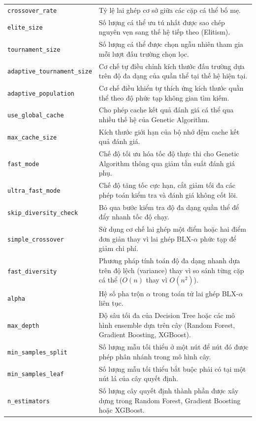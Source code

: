 \documentclass[12pt,a4paper]{article}
\begin{document}
\begin{longtable}{p{} p{}}
\texttt{crossover\_rate} & Tỷ lệ lai ghép cơ sở giữa các cặp cá thể bố mẹ. \\
\texttt{elite\_size} & Số lượng cá thể ưu tú nhất được sao chép nguyên vẹn sang thế hệ tiếp theo (Elitism). \\
\texttt{tournament\_size} & Số lượng cá thể được chọn ngẫu nhiên tham gia mỗi lượt đấu trường chọn lọc. \\
\texttt{adaptive\_tournament\_size} & Cơ chế tự điều chỉnh kích thước đấu trường dựa trên độ đa dạng của quần thể tại thế hệ hiện tại. \\
\texttt{adaptive\_population} & Cơ chế điều khiển tự thích ứng kích thước quần thể theo độ phức tạp không gian tìm kiếm. \\
\texttt{use\_global\_cache} & Cho phép cache kết quả đánh giá cá thể qua nhiều thế hệ của Genetic Algorithm. \\
\texttt{max\_cache\_size} & Kích thước giới hạn của bộ nhớ đệm cache kết quả đánh giá. \\
\texttt{fast\_mode} & Chế độ tối ưu hóa tốc độ thực thi cho Genetic Algorithm thông qua giảm tần suất đánh giá phụ. \\
\texttt{ultra\_fast\_mode} & Chế độ tăng tốc cực hạn, cắt giảm tối đa các phép toán kiểm tra và đánh giá không cốt lõi. \\
\texttt{skip\_diversity\_check} & Bỏ qua bước kiểm tra độ đa dạng quần thể để đẩy nhanh tốc độ chạy. \\
\texttt{simple\_crossover} & Sử dụng cơ chế lai ghép một điểm hoặc hai điểm đơn giản thay vì lai ghép BLX-$\alpha$ phức tạp để giảm chi phí. \\
\texttt{fast\_diversity} & Phương pháp tính toán độ đa dạng nhanh dựa trên độ lệch (variance) thay vì so sánh từng cặp cá thể ($O(n)$ thay vì $O(n^2)$). \\
\texttt{alpha} & Hệ số pha trộn $\alpha$ trong toán tử lai ghép BLX-$\alpha$ liên tục. \\
\texttt{max\_depth} & Độ sâu tối đa của Decision Tree hoặc các mô hình ensemble dựa trên cây (Random Forest, Gradient Boosting, XGBoost). \\
\texttt{min\_samples\_split} & Số lượng mẫu tối thiểu ở một nút để nút đó được phép phân nhánh trong mô hình cây. \\
\texttt{min\_samples\_leaf} & Số lượng mẫu tối thiểu bắt buộc phải có tại một nút lá của cây quyết định. \\
\texttt{n\_estimators} & Số lượng cây quyết định thành phần được xây dựng trong Random Forest, Gradient Boosting hoặc XGBoost. \\

\end{longtable}
\end{document}
